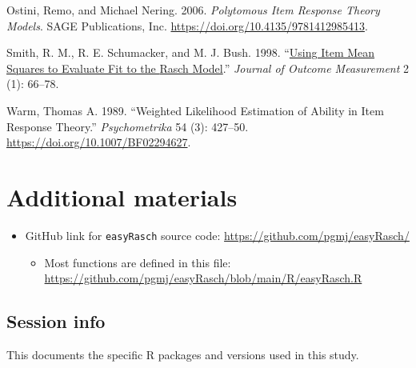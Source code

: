 \documentclass[
  letterpaper,
  DIV=11,
  numbers=noendperiod]{scrartcl}
\providecommand{\tightlist}{%
  \setlength{\itemsep}{0pt}\setlength{\parskip}{0pt}}\usepackage{longtable,booktabs,array}
\newlength{\cslhangindent}
\newenvironment{CSLReferences}[2] %
 {\begin{list}{}{%
  \setlength{\itemindent}{0pt}
  \setlength{\leftmargin}{0pt}
  \setlength{\parsep}{0pt}
  \ifodd #1
   \setlength{\leftmargin}{\cslhangindent}
   \setlength{\itemindent}{-1\cslhangindent}
  \fi
  \setlength{\itemsep}{#2\baselineskip}}}
 {\end{list}}
\begin{document}
\begin{CSLReferences}{1}{0}
Ostini, Remo, and Michael Nering. 2006. \emph{Polytomous {Item}
{Response} {Theory} {Models}}. SAGE Publications, Inc.
\url{https://doi.org/10.4135/9781412985413}.

Smith, R. M., R. E. Schumacker, and M. J. Bush. 1998.
{``\href{https://www.ncbi.nlm.nih.gov/pubmed/9661732}{Using Item Mean
Squares to Evaluate Fit to the {Rasch} Model}.''} \emph{Journal of
Outcome Measurement} 2 (1): 66--78.

Warm, Thomas A. 1989. {``Weighted Likelihood Estimation of Ability in
Item Response Theory.''} \emph{Psychometrika} 54 (3): 427--50.
\url{https://doi.org/10.1007/BF02294627}.

\end{CSLReferences}

\section{Additional materials}\label{sec-addmat}

\begin{itemize}
\tightlist
\item
  GitHub link for \texttt{easyRasch} source code:
  \url{https://github.com/pgmj/easyRasch/}

  \begin{itemize}
  \tightlist
  \item
    Most functions are defined in this file:
    \url{https://github.com/pgmj/easyRasch/blob/main/R/easyRasch.R}
  \end{itemize}
\end{itemize}

\subsection{Session info}\label{session-info}

This documents the specific R packages and versions used in this study.
\end{document}
